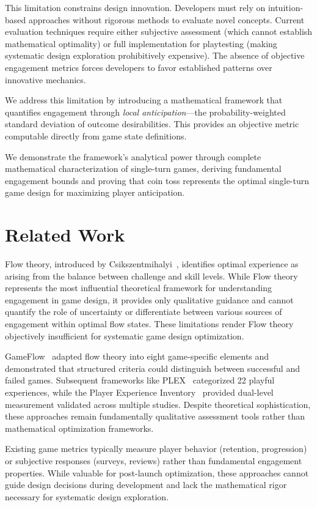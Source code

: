 \documentclass{article}
\begin{document}
This limitation constrains design innovation. Developers must rely on intuition-based approaches without rigorous methods to evaluate novel concepts. Current evaluation techniques require either subjective assessment (which cannot establish mathematical optimality) or full implementation for playtesting (making systematic design exploration prohibitively expensive). The absence of objective engagement metrics forces developers to favor established patterns over innovative mechanics.

We address this limitation by introducing a mathematical framework that quantifies engagement through \emph{local anticipation}—the probability-weighted standard deviation of outcome desirabilities. This provides an objective metric computable directly from game state definitions.

We demonstrate the framework's analytical power through complete mathematical characterization of single-turn games, deriving fundamental engagement bounds and proving that coin toss represents the optimal single-turn game design for maximizing player anticipation.

\section{Related Work}

Flow theory, introduced by Csikszentmihalyi~\cite{csikszentmihalyi1990flow}, identifies optimal experience as arising from the balance between challenge and skill levels. While Flow theory represents the most influential theoretical framework for understanding engagement in game design, it provides only qualitative guidance and cannot quantify the role of uncertainty or differentiate between various sources of engagement within optimal flow states. These limitations render Flow theory objectively insufficient for systematic game design optimization.

GameFlow~\cite{sweetser2005gameflow} adapted flow theory into eight game-specific elements and demonstrated that structured criteria could distinguish between successful and failed games. Subsequent frameworks like PLEX~\cite{arrasvuori2010plex} categorized 22 playful experiences, while the Player Experience Inventory~\cite{abeele2020pxi} provided dual-level measurement validated across multiple studies. Despite theoretical sophistication, these approaches remain fundamentally qualitative assessment tools rather than mathematical optimization frameworks.

Existing game metrics typically measure player behavior (retention, progression) or subjective responses (surveys, reviews) rather than fundamental engagement properties. While valuable for post-launch optimization, these approaches cannot guide design decisions during development and lack the mathematical rigor necessary for systematic design exploration.
\end{document}
